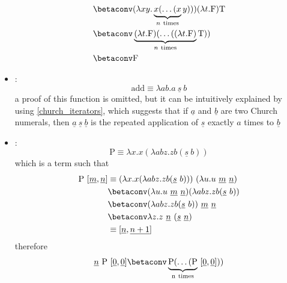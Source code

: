 \documentclass[a4paper, 12pt]{report}
\begin{document}
\begin{itemize}
\begin{equation*}
\begin{split}
                                                &\betaconv (\lambda xy. \underbrace{x ( \ldots ( x}_{n \ \mathrm{times}}y))) (\lambda t.\mathrm F)\mathrm T \\
                                                &\betaconv \underbrace{(\lambda t.\mathrm F)(\ldots ((\lambda t.\mathrm F)}_{n \ \mathrm{times}} \mathrm T)) \\
                                                &\betaconv \mathrm F
                \end{split}
            \end{equation*}
        \item {}: $$\mathrm{add} \equiv \lambda ab.a \ \underline s \ b$$ a proof of this function is omitted, but it can be intuitively explained by using \cref{church_iterators}, which suggests that if $\underline a$ and $\underline b$ are two Church numerals, then $\underline a \ \underline s \ \underline b$ is the repeated application of $\underline s$ exactly $a$ times to $\underline b$
        \item {}: $$\mathrm P \equiv \lambda x.x(\lambda ab z. zb (\underline s \ b))$$ which is a term such that
            \begin{equation*}
                \begin{split}
                    \mathrm P \ [\underline m, \underline n] &\equiv (\lambda x.x(\lambda ab z. zb (\underline s \ b))) \ (\lambda u. u \ \underline m \ \underline n) \\
                                                             &\betaconv (\lambda u. u \ \underline m \ \underline n) (\lambda abz.zb(\underline s \ b)) \\
                                                             &\betaconv (\lambda abz. zb(\underline s \ b)) \ \underline m \ \underline n \\
                                                             &\betaconv \lambda z . z \ \underline n \ (\underline s \ \underline n) \\
                                                             &\equiv [\underline n, \underline{n + 1}]
                \end{split}
            \end{equation*}
            therefore
            \begin{equation*}
                \begin{split}
                    \underline n \ \mathrm P \ [\underline 0, \underline 0] &\betaconv \underbrace{\mathrm P( \ldots (\mathrm P}_{\mathrm{n \ times}} \ [\underline 0, \underline 0])) \\

\end{split}
\end{equation*}
\end{itemize}
\end{document}
